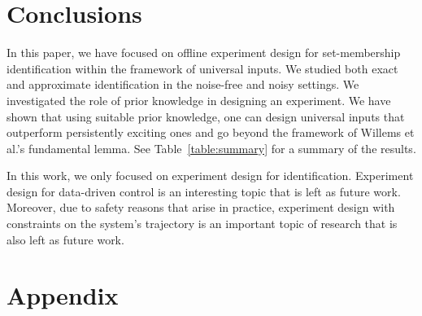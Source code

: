 \documentclass[journal,twoside,web]{ieeecolor}
\newcommand{\set}[2]{\left\{#1 \mid #2\right\}}
\begin{document}

\section{Conclusions}
\label{sec:conclusions}

In this paper, we have focused on offline experiment design for set-membership identification within the framework of universal inputs. We studied both exact and approximate identification in the noise-free and noisy settings. We investigated the role of prior knowledge in designing an experiment. We have shown that using suitable prior knowledge, one can design universal inputs that outperform persistently exciting ones and go beyond the framework of Willems et al.'s fundamental lemma. See Table~\ref{table:summary} for a summary of the results.

In this work, we only focused on experiment design for identification. Experiment design for data-driven control is an interesting topic that is left as future work. Moreover, due to safety reasons that arise in practice, experiment design with constraints on the system's trajectory is an important topic of research that is also left as future work. 

\section{Appendix}
\end{document}
